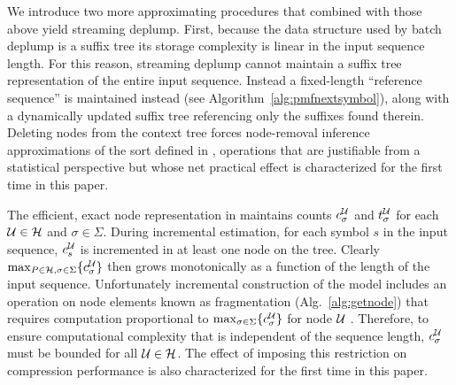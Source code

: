 We introduce two more approximating procedures that combined with those above yield streaming deplump.  First, because the data structure used by batch deplump is a suffix tree its storage complexity is linear in the input sequence length.  For this reason, streaming deplump cannot maintain a suffix tree representation of the entire input sequence.  Instead a fixed-length ``reference sequence''  is maintained instead (see Algorithm~\ref{alg:pmfnextsymbol}), along with a dynamically updated suffix tree referencing only the suffixes found therein.  Deleting nodes from the context tree forces node-removal inference approximations of the sort defined in \citep{Bartlett2010}, operations that are justifiable from a statistical perspective but whose net practical effect is characterized for the first time in this paper. %

The efficient, exact node representation in \cite{Gasthaus2011} maintains counts $c^\U_\sigma$ and $t^\U_\sigma$ for each $\U \in \mathcal{H}$ and $\sigma \in \Sigma$.  During incremental estimation, for each symbol $s$ in the input sequence, $c^\U_s$ is incremented in at least one node on the tree.  Clearly $\max_{P \in \mathcal{H}, \sigma \in \Sigma} \{ c^\U_\sigma \}$ then grows monotonically as a function of the length of the input sequence. Unfortunately incremental construction of the model includes an operation on node elements known as fragmentation (Alg.~\ref{alg:getnode}) that requires computation proportional to $\max_{\sigma \in \Sigma} \{ c_\sigma^\U \}$ for node $\U$ \citep{Gasthaus2011}. Therefore, to ensure computational complexity that is independent of the sequence length, $c^\U_\sigma$ must be bounded for all $\U \in \mathcal{H}$.  The effect of imposing this restriction on compression performance is also characterized for the first time in this paper. 






